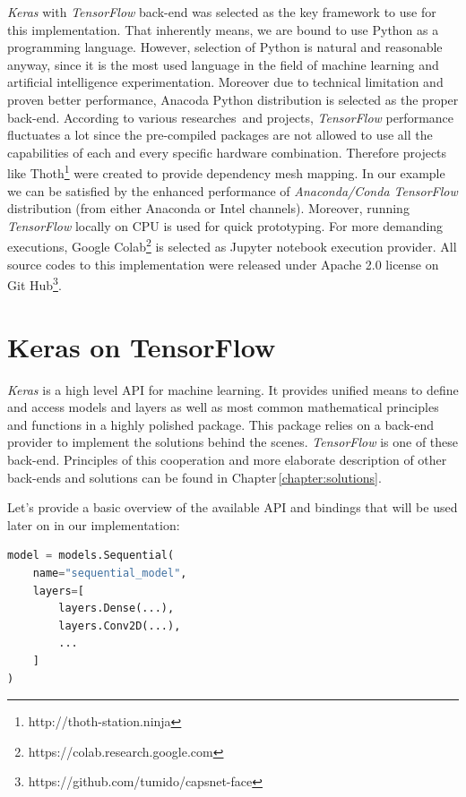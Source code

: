 \textit{Keras} with \textit{TensorFlow} back-end was selected as the key framework to use for this implementation. That inherently means, we are bound to use Python as a programming language. However, selection of Python is natural and reasonable anyway, since it is the most used language in the field of machine learning and artificial intelligence experimentation. Moreover due to technical limitation and proven better performance, Anacoda Python distribution is selected as the proper back-end. According to various researches\,\cite{stop_pip} and projects, \textit{TensorFlow} performance fluctuates a lot since the pre-compiled packages are not allowed to use all the capabilities of each and every specific hardware combination. Therefore projects like Thoth\footnote{http://thoth-station.ninja} were created to provide dependency mesh mapping. In our example we can be satisfied by the enhanced performance of \textit{Anaconda/Conda TensorFlow} distribution (from either Anaconda or Intel channels). Moreover, running \textit{TensorFlow} locally on CPU is used for quick prototyping. For more demanding executions, Google Colab\footnote{https://colab.research.google.com} is selected as Jupyter notebook execution provider. All source codes to this implementation were released under Apache 2.0 license on Git Hub\footnote{https://github.com/tumido/capsnet-face}.

\section{Keras on TensorFlow}

\textit{Keras} is a high level API for machine learning. It provides unified means to define and access models and layers as well as most common mathematical principles and functions in a highly polished package. This package relies on a back-end provider to implement the solutions behind the scenes. \textit{TensorFlow} is one of these back-end. Principles of this cooperation and more elaborate description of other back-ends and solutions can be found in Chapter\,\ref{chapter:solutions}.

Let's provide a basic overview of the available API and bindings that will be used later on in our implementation:

\begin{lstlisting}[language=Python, caption=Keras model defined as a sequence.]
model = models.Sequential(
    name="sequential_model",
    layers=[
        layers.Dense(...),
        layers.Conv2D(...),
        ...
    ]
)
\end{lstlisting}

